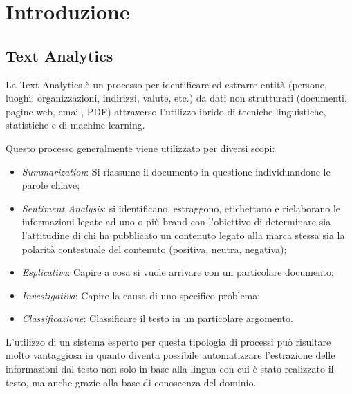 
\section{Introduzione}

\subsection{Text Analytics}
\nocite{wiki:textMining}
\nocite{gartner:textAnalytics}
\nocite{expertsystem:textAnalytics}
La Text Analytics è un processo per identificare ed estrarre entità (persone, luoghi, organizzazioni, indirizzi, valute, etc.) da dati non strutturati (documenti, pagine web, email, PDF) attraverso l'utilizzo ibrido di tecniche linguistiche, statistiche e di machine learning. 

Questo processo generalmente viene utilizzato per diversi scopi:

\begin{itemize}
	\item \emph{Summarization}: Si riassume il documento in questione individuandone le parole chiave;
	\item \emph{Sentiment Analysis}: si identificano, estraggono, etichettano e rielaborano le informazioni legate ad uno o più brand con l'obiettivo di determinare sia l'attitudine di chi ha pubblicato un contenuto legato alla marca stessa sia la polarità contestuale del contenuto (positiva, neutra, negativa);
	\item \emph{Esplicativa}: Capire a cosa si vuole arrivare con un particolare documento;
	\item \emph{Investigativa}: Capire la causa di uno specifico problema;
	\item \emph{Classificazione}: Classificare il testo in un particolare argomento.
\end{itemize}

L'utilizzo di un sistema esperto per questa tipologia di processi può risultare molto vantaggiosa in quanto diventa possibile automatizzare l'estrazione delle informazioni dal testo non solo in base alla lingua con cui è stato realizzato il testo, ma anche grazie alla base di conoscenza del dominio.


